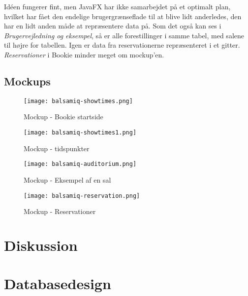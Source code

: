 Idéen fungerer fint, men JavaFX har ikke samarbejdet på et optimalt plan, hvilket har fået den endelige brugergrænseflade til at blive lidt anderledes, den har en lidt anden måde at repræsentere data på. Som det også kan ses i \textit{Brugervejledning og eksempel}, så er alle forestillinger i samme tabel, med salene til højre for tabellen. Igen er data fra reservationerne repræsenteret i et gitter. \textit{Reservationer} i Bookie minder meget om mockup'en. 


\subsection{Mockups}

\begin{figure}[h]
  \centering
  \texttt{[image: balsamiq-showtimes.png]}
  \caption{Mockup - Bookie startside}
  \label{mockup: balsamiq-showtimes}
\end{figure}

\begin{figure}[h]
  \centering
  \texttt{[image: balsamiq-showtimes1.png]}
  \caption{Mockup - tidspunkter}
  \label{mockup: balsamiq-showtimes1}
\end{figure}

\begin{figure}[h]
  \centering
  \texttt{[image: balsamiq-auditorium.png]}
  \caption{Mockup - Eksempel af en sal}
  \label{mockup: balsamiq-auditorium}
\end{figure}

\begin{figure}[h]
  \centering
  \texttt{[image: balsamiq-reservation.png]}
  \caption{Mockup - Reservationer}
  \label{mockup: balsamiq-reservation}
\end{figure}

\section{Diskussion}

\section{Databasedesign}

